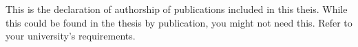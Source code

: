This is the declaration of authorship of publications included in this theis. While this could be found in the thesis by publication, you might not need this. 
Refer to your university's requirements. 

% 

